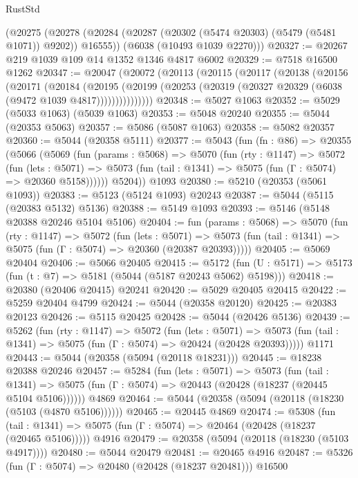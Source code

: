 \begin{lexlean}{RustStd}
\begin{coremodule}
    (@20275
      (@20278 (@20284 (@20287 (@20302 (@5474 @20303) (@5479 (@5481 @1071)) @9202)) @16555))
      (@6038 (@10493 @1039 @2270)))
@20327 := @20267 @219 @1039 @109 @14 @1352 @1346 @4817 @6002
@20329 := @7518 @16500 @1262
@20347 := @20047
    (@20072
      (@20113
        (@20115
          (@20117
            (@20138
              (@20156
                (@20171
                  (@20184
                    (@20195
                      (@20199
                        (@20253 (@20319 (@20327 @20329 (@6038 (@9472 @1039 @4817)))))))))))))))
@20348 := @5027 @1063
@20352 := @5029 (@5033 @1063) (@5039 @1063)
@20353 := @5048 @20240
@20355 := @5044 (@20353 @5063)
@20357 := @5086 (@5087 @1063)
@20358 := @5082 @20357
@20360 := @5044 (@20358 @5111)
@20377 := @5043
    (fun (fn : @86) =>
    @20355
      (@5066
        (@5069
          (fun (params : @5068) =>
          @5070
            (fun (rty : @1147) =>
            @5072
              (fun (lets : @5071) =>
              @5073 (fun (tail : @1341) => @5075 (fun (Γ : @5074) => @20360 @5158))))))
        @5204))
    @1093
@20380 := @5210 (@20353 (@5061 @1093))
@20383 := @5123 (@5124 @1093) @20243
@20387 := @5044 (@5115 (@20383 @5132) @5136)
@20388 := @5149 @1093
@20393 := @5146 (@5148 @20388 @20246 @5104 @5106)
@20404 := fun (params : @5068) =>
  @5070
    (fun (rty : @1147) =>
    @5072
      (fun (lets : @5071) =>
      @5073 (fun (tail : @1341) => @5075 (fun (Γ : @5074) => @20360 (@20387 @20393)))))
@20405 := @5069 @20404
@20406 := @5066 @20405
@20415 := @5172
    (fun (U : @5171) => @5173 (fun (t : @7) => @5181 (@5044 (@5187 @20243 @5062) @5198)))
@20418 := @20380 (@20406 @20415) @20241
@20420 := @5029 @20405 @20415
@20422 := @5259 @20404 @4799
@20424 := @5044 (@20358 @20120)
@20425 := @20383 @20123
@20426 := @5115 @20425
@20428 := @5044 (@20426 @5136)
@20439 := @5262
    (fun (rty : @1147) =>
    @5072
      (fun (lets : @5071) =>
      @5073 (fun (tail : @1341) => @5075 (fun (Γ : @5074) => @20424 (@20428 @20393)))))
    @1171
@20443 := @5044 (@20358 (@5094 (@20118 @18231)))
@20445 := @18238 @20388 @20246
@20457 := @5284
    (fun (lets : @5071) =>
    @5073
      (fun (tail : @1341) =>
      @5075 (fun (Γ : @5074) => @20443 (@20428 (@18237 (@20445 @5104 @5106))))))
    @4869
@20464 := @5044 (@20358 (@5094 (@20118 (@18230 (@5103 (@4870 @5106))))))
@20465 := @20445 @4869
@20474 := @5308
    (fun (tail : @1341) => @5075 (fun (Γ : @5074) => @20464 (@20428 (@18237 (@20465 @5106)))))
    @4916
@20479 := @20358 (@5094 (@20118 (@18230 (@5103 @4917))))
@20480 := @5044 @20479
@20481 := @20465 @4916
@20487 := @5326 (fun (Γ : @5074) => @20480 (@20428 (@18237 @20481))) @16500

\end{coremodule}
\end{lexlean}
